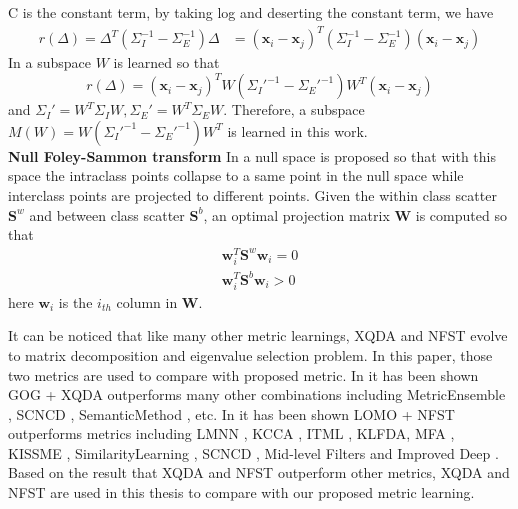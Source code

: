 C is the constant term, by taking log and deserting the constant term, we have 
\begin{equation}
\begin{aligned}
r(\Delta) = \Delta^T(\Sigma_I^{-1} - \Sigma_E^{-1})\Delta 
	   & = (\bm{x}_i - \bm{x}_j)^T(\Sigma_I^{-1} - \Sigma_E^{-1})(\bm{x}_i - \bm{x}_j)
\end{aligned}
\end{equation}
In \cite{LOMO} a subspace $W$ is learned so that 
\begin{equation}
r(\Delta) = (\bm{x}_i - \bm{x}_j)^TW({\Sigma_I}'^{-1} - {\Sigma_E}'^{-1})W^T(\bm{x}_i - \bm{x}_j)
\end{equation}
and ${\Sigma_I}' = W^T\Sigma_IW, {\Sigma_E}' = W^T\Sigma_EW$. Therefore, a subspace $M(W) = W({\Sigma_I}'^{-1} - {\Sigma_E}'^{-1})W^T$ is learned in this work.\\
\indent \textbf{Null Foley-Sammon transform} In \cite{NFST} a null space is proposed so that with this space the intraclass points collapse to a same point in the null space while interclass points are projected to different points. Given the within class scatter $\bm{S}^w$ and between class scatter $\bm{S}^b$, an optimal projection matrix $\bm{W}$ is computed so that 
\begin{equation}
\begin{aligned}
\bm{w}_i^T\bm{S}^w\bm{w}_i = 0\\
\bm{w}_i^T\bm{S}^b\bm{w}_i > 0
\end{aligned}
\end{equation}
here $\bm{w}_i$ is the $i_{th}$ column in $\bm{W}$.

It can be noticed that like many other metric learnings, XQDA and NFST evolve to matrix decomposition and eigenvalue selection problem. In this paper, those two metrics are used to compare with proposed metric. In \cite{GOG} it has been shown GOG + XQDA outperforms many other combinations including MetricEnsemble \cite{MetricEnsembles}, SCNCD \cite{SCNCD}, SemanticMethod \cite{SemanticMethod}, etc. In \cite{ NFST} it has been shown LOMO + NFST outperforms metrics including LMNN \cite{LMNN}, KCCA \cite{KCCA}, ITML \cite{ITML}, KLFDA\cite{KLFDA}, MFA \cite{KernelVersionMetrics}, KISSME \cite{KISSME}, SimilarityLearning \cite{SimilarityLearning}, SCNCD \cite{SCNCD}, Mid-level Filters \cite{MidlevelFilters} and Improved Deep \cite{ImprovedCNN}. Based on the result that XQDA and NFST outperform other metrics, XQDA and NFST are used in this thesis to compare with our proposed metric learning. 


